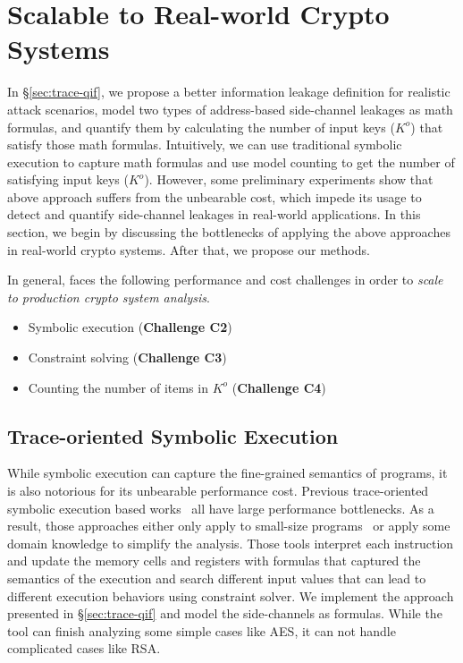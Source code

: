 \section{Scalable to Real-world Crypto Systems}
\label{sec:scala}

In \S\ref{sec:trace-qif}, we propose a better information leakage definition
for realistic attack scenarios, model two types of address-based side-channel
leakages
as math formulas, and quantify them by calculating the number of input
keys ($K^o$) that satisfy those math formulas. Intuitively, we can use
traditional symbolic execution to capture math formulas and use model
counting to get the number of satisfying input keys ($K^o$).
However, some preliminary experiments show that above approach suffers from the unbearable cost, 
which impede its usage
to detect and quantify side-channel leakages in real-world applications. 
In this section, we begin by discussing the bottlenecks of applying the 
above approaches in real-world crypto systems. After that, we propose
our methods.

In general, \tool{} faces the following performance and cost  challenges
in order to \emph{scale to production crypto system analysis}. 
\begin{itemize}
    \item Symbolic execution (\textbf{Challenge C2})
    \item Constraint solving (\textbf{Challenge C3})
    \item Counting the number of items in $K^o$ (\textbf{Challenge C4})
\end{itemize}

\subsection{Trace-oriented Symbolic Execution}
While symbolic execution can capture the fine-grained semantics of programs,
it is also notorious for its unbearable performance cost. Previous 
trace-oriented symbolic execution based
works~\cite{203878,Chattopadhyay:2017:QIL:3127041.3127044} all 
have large performance bottlenecks. As a result, those approaches 
either only apply to small-size programs~\cite{Chattopadhyay:2017:QIL:3127041.3127044} 
or apply some domain knowledge to simplify the analysis.
Those tools interpret each instruction and update the memory cells and registers with
formulas that captured the semantics of the execution and search different 
input values that can lead to different execution behaviors using constraint solver.
We implement the approach presented in \S\ref{sec:trace-qif} and
model the side-channels as formulas.
While the tool can finish analyzing some simple cases like AES, 
it can not handle complicated cases like RSA. 

